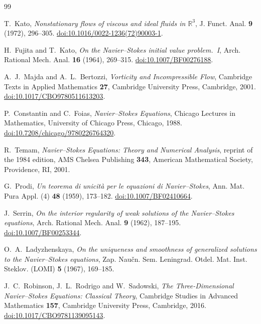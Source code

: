 \documentclass[11pt]{article}
\theoremstyle{definition}
\newcommand{\R}{\mathbb R}
\begin{document}
\begin{thebibliography}{99}

T.~Kato,
\emph{Nonstationary flows of viscous and ideal fluids in $\R^3$},
J. Funct. Anal. \textbf{9} (1972), 296--305.
\href{https://doi.org/10.1016/0022-1236(72)90003-1}{doi:10.1016/0022-1236(72)90003-1}.

H.~Fujita and T.~Kato,
\emph{On the Navier--Stokes initial value problem.~I},
Arch. Rational Mech. Anal. \textbf{16} (1964), 269--315.
\href{https://doi.org/10.1007/BF00276188}{doi:10.1007/BF00276188}.

A.~J.~Majda and A.~L.~Bertozzi,
\emph{Vorticity and Incompressible Flow},
Cambridge Texts in Applied Mathematics \textbf{27},
Cambridge University Press, Cambridge, 2001.
\href{https://doi.org/10.1017/CBO9780511613203}{doi:10.1017/CBO9780511613203}.

P.~Constantin and C.~Foias,
\emph{Navier--Stokes Equations},
Chicago Lectures in Mathematics,
University of Chicago Press, Chicago, 1988.
\href{https://doi.org/10.7208/chicago/9780226764320}{doi:10.7208/chicago/9780226764320}.

R.~Temam,
\emph{Navier--Stokes Equations: Theory and Numerical Analysis},
reprint of the 1984 edition,
AMS Chelsea Publishing \textbf{343},
American Mathematical Society, Providence, RI, 2001.

G.~Prodi,
\emph{Un teorema di unicit\`a per le equazioni di Navier--Stokes},
Ann. Mat. Pura Appl. (4) \textbf{48} (1959), 173--182.
\href{https://doi.org/10.1007/BF02410664}{doi:10.1007/BF02410664}.

J.~Serrin,
\emph{On the interior regularity of weak solutions of the Navier--Stokes
equations},
Arch. Rational Mech. Anal. \textbf{9} (1962), 187--195.
\href{https://doi.org/10.1007/BF00253344}{doi:10.1007/BF00253344}.

O.~A.~Ladyzhenskaya,
\emph{On the uniqueness and smoothness of generalized solutions to the
Navier--Stokes equations},
Zap. Nau\v{c}n. Sem. Leningrad. Otdel. Mat. Inst. Steklov. (LOMI)
\textbf{5} (1967), 169--185.

J.~C.~Robinson, J.~L.~Rodrigo and W.~Sadowski,
\emph{The Three-Dimensional Navier--Stokes Equations: Classical Theory},
Cambridge Studies in Advanced Mathematics \textbf{157},
Cambridge University Press, Cambridge, 2016.
\href{https://doi.org/10.1017/CBO9781139095143}{doi:10.1017/CBO9781139095143}.


\end{thebibliography}
\end{document}
